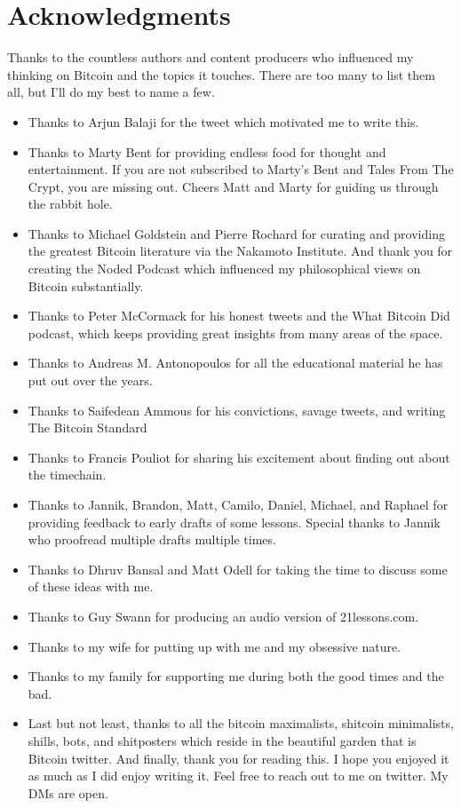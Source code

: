 \chapter*{Acknowledgments}

Thanks to the countless authors and content producers who influenced my thinking
on Bitcoin and the topics it touches. There are too many to list them all, but
I’ll do my best to name a few.

\begin{itemize}
  \item Thanks to Arjun Balaji for the tweet which motivated me to write this.
  \item Thanks to Marty Bent for providing endless food for thought and entertainment. If you are not subscribed to Marty’s Bent and Tales From The Crypt, you are missing out. Cheers Matt and Marty for guiding us through the rabbit hole.
  \item Thanks to Michael Goldstein and Pierre Rochard for curating and providing the greatest Bitcoin literature via the Nakamoto Institute. And thank you for creating the Noded Podcast which influenced my philosophical views on Bitcoin substantially.
  \item Thanks to Peter McCormack for his honest tweets and the What Bitcoin Did podcast, which keeps providing great insights from many areas of the space.
  \item Thanks to Andreas M. Antonopoulos for all the educational material he has put out over the years.
  \item Thanks to Saifedean Ammous for his convictions, savage tweets, and writing The Bitcoin Standard
  \item Thanks to Francis Pouliot for sharing his excitement about finding out about the timechain.
  \item Thanks to Jannik, Brandon, Matt, Camilo, Daniel, Michael, and Raphael for providing feedback to early drafts of some lessons. Special thanks to Jannik who proofread multiple drafts multiple times.
  \item Thanks to Dhruv Bansal and Matt Odell for taking the time to discuss some of these ideas with me.
  \item Thanks to Guy Swann for producing an audio version of 21lessons.com.
  \item Thanks to my wife for putting up with me and my obsessive nature.
  \item Thanks to my family for supporting me during both the good times and the bad.
  \item Last but not least, thanks to all the bitcoin maximalists, shitcoin minimalists, shills, bots, and shitposters which reside in the beautiful garden that is Bitcoin twitter. And finally, thank you for reading this. I hope you enjoyed it as much as I did enjoy writing it. Feel free to reach out to me on twitter. My DMs are open.
\end{itemize}
